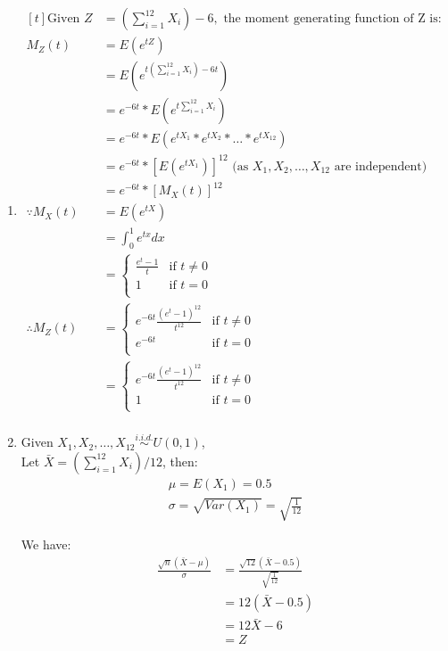 \documentclass{article}
\begin{document}
\begin{enumerate}
\begin{enumerate}[label=(\roman*)]
    \item $\begin{aligned}[t]
    \text{Given } Z &= ( \sum_{i=1}^{12} X_i ) - 6, \text{ the moment generating function of Z is:} \\
    M_Z(t) &= E(e^{tZ}) \\
    &= E(e^{t( \sum_{i=1}^{12} X_i ) - 6t}) \\
    &= e^{-6t} * E(e^{t \sum_{i=1}^{12} X_i} ) \\
    &= e^{-6t} * E(e^{tX_1} * e^{tX_2} * \dots * e^{tX_{12}}) \\
    &= e^{-6t} * [E(e^{tX_1})]^{12} \text{ (as } X_1, X_2, \dots , X_{12} \text{ are independent)} \\
    &= e^{-6t} * [M_X(t)]^{12} \\
    \because M_X(t) &= E(e^{tX}) \\
    &= \int_{0}^1 e^{tx} dx \\
    &= \begin{cases}
        \frac{e^t - 1}{t} & \text{if } t \neq 0 \\
        1 & \text{if } t = 0 \\
    \end{cases} \\
    \therefore M_Z(t) &= \begin{cases}
        e^{-6t} \frac{(e^{t} - 1)^{12}}{t^{12}} & \text{if } t \neq 0 \\
        e^{-6t} & \text{if } t = 0 \\
    \end{cases} \\
    &= \begin{cases}
        e^{-6t} \frac{(e^{t} - 1)^{12}}{t^{12}} & \text{if } t \neq 0 \\
        1 & \text{if } t = 0 \\
    \end{cases} \\
    \end{aligned}$

    \item
    Given $X_1, X_2, \dots, X_{12} \overset{i.i.d.}{\sim} U(0, 1)$, \\
    Let $\bar{X} = (\sum_{i=1}^{12} X_i) / 12$, then:
    \begin{align*}
        \mu = E(X_1) = 0.5 \\
        \sigma = \sqrt{Var(X_1)} = \sqrt{\frac{1}{12}}
    \end{align*}

    We have:
    \begin{align*}
        \frac{\sqrt{n}(\bar{X} - \mu)}{\sigma} &= \frac{\sqrt{12}(\bar{X} - 0.5)}{\sqrt{\frac{1}{12}}} \\
        &= 12 (\bar{X} - 0.5) \\
        &= 12 \bar{X} - 6 \\
        &= Z
    \end{align*}


\end{enumerate}
\end{enumerate}
\end{document}
